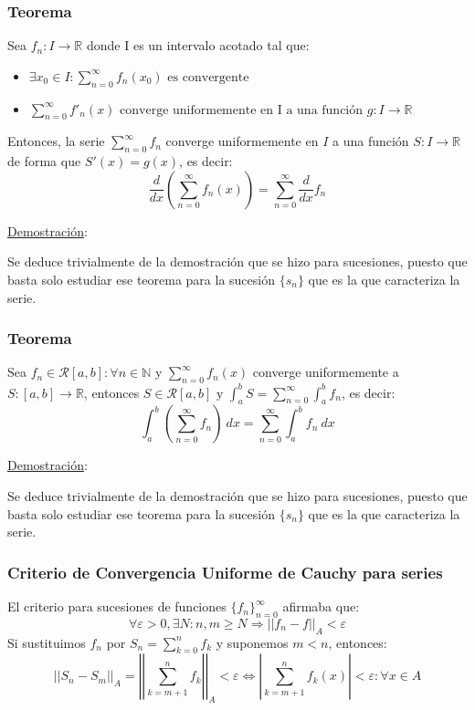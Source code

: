 \documentclass[10pt,a4paper,openright]{book}
\begin{document}
\subsubsection*{Teorema}
Sea $f_n : I \to \mathbb{R}$ donde I es un intervalo acotado tal que:
\begin{itemize}
\item $\exists x_0 \in I :  \displaystyle\sum_{n = 0}^{\infty} f_n (x_0) \mbox{ es convergente }$
\item $\displaystyle \sum_{n = 0}^{\infty} f'_n (x) \mbox{ converge uniformemente en I a una función } g:I \to \mathbb{R}$
\end{itemize}
Entonces, la serie $\sum_{n = 0}^{\infty} f_n$ converge uniformemente en $I$ a una función $S: I \to \mathbb{R}$ de forma que $S'(x) = g(x)$, es decir:
$$\frac{d}{dx}\left( \sum_{n = 0}^{\infty} f_n (x) \right) = \sum_{n = 0}^{\infty} \frac{d}{dx} f_n$$

\underline{Demostración}:

Se deduce trivialmente de la demostración que se hizo para sucesiones, puesto que basta solo estudiar ese teorema para la sucesión $\{s_n\}$ que es la que caracteriza la serie.

\subsubsection*{Teorema}
Sea $f_n \in \mathcal{R}[a,b] : \forall n \in \mathbb N$ y $\sum_{n = 0}^{\infty} f_n (x)$ converge uniformemente a $S:[a,b] \to \mathbb{R}$, entonces $S \in \mathcal{R}[a,b] \mbox{ y } \int_{a}^{b} S = \sum_{n=0}^{\infty} \int_{a}^{b} f_n$, es decir:
$$\int_{a}^{b} \left(\sum_{n = 0}^{\infty} f_n \right) \ dx= \sum_{n=0}^{\infty} \int_{a}^{b} f_n \ dx$$

\underline{Demostración}:

Se deduce trivialmente de la demostración que se hizo para sucesiones, puesto que basta solo estudiar ese teorema para la sucesión $\{s_n\}$ que es la que caracteriza la serie.

\subsubsection*{Criterio de Convergencia Uniforme de Cauchy para series}
El criterio para sucesiones de funciones $\{f_n\}_{n = 0}^\infty$ afirmaba que:
$$\forall \varepsilon > 0, \exists N : n,m \geq N \Rightarrow ||f_n  - f||_A  < \varepsilon$$
Si sustituimos $f_n$ por $S_n =  \sum_{k=0}^{n} f_k$ y suponemos $m < n$, entonces:
$$||S_n - S_m||_A = \left|\left|\sum_{k=m + 1}^{n} f_k \right|\right|_A < \varepsilon \Leftrightarrow \left|\sum_{k=m + 1}^{n} f_k (x)\right| < \varepsilon : \forall x \in A$$
\end{document}
